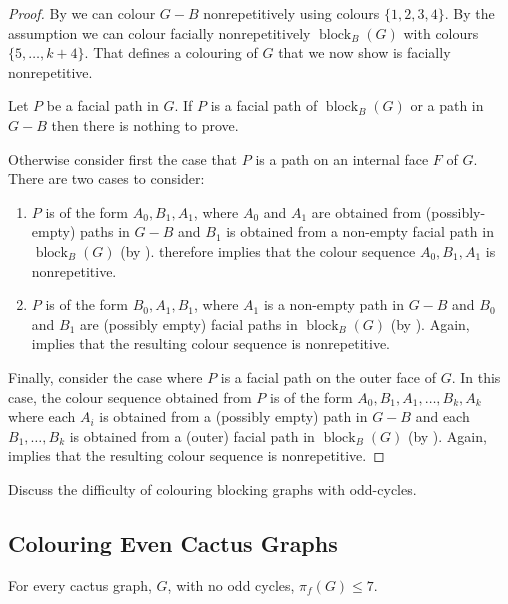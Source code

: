 \documentclass{patmorin}
\DeclareMathOperator{\block}{block}
\begin{document}
\begin{proof}
By  we can colour $G-B$ nonrepetitively using colours
$\{1,2,3,4\}$. By the assumption we can colour  facially
nonrepetitively $\block_{B}(G)$ with colours $\{5,\dots, k+4\}$. That
defines a colouring of $G$ that we now show is facially
nonrepetitive. 

Let $P$ be a facial path in $G$. If $P$ is a facial path of
$\block_{B}(G)$ or a path in $G-B$ then there is nothing to prove.

Otherwise consider first the case that $P$ is a path on an internal
face $F$ of $G$.   There are two cases to consider:
\begin{enumerate}
\item $P$ is of the form $A_0,B_1,A_1$, where $A_0$ and $A_1$ are obtained
from (possibly-empty) paths in $G-B$ and $B_1$ is obtained from a
non-empty facial path in $\block_B(G)$ (by ).   therefore
implies that the colour sequence $A_0,B_1,A_1$ is nonrepetitive.

\item $P$ is of the form $B_0,A_1,B_1$, where $A_1$ is a non-empty path
  in $G-B$ and $B_0$ and $B_1$ are (possibly empty) facial paths in
  $\block_B(G)$ (by ).
Again,  implies that the resulting colour sequence
is nonrepetitive.
\end{enumerate}

Finally, consider the case where $P$ is a facial path on the outer
face of $G$.  In this case, the colour sequence obtained from $P$ is
of the form $A_0,B_1,A_1,\ldots,B_k,A_k$ where each $A_i$ is obtained
from a (possibly empty) path in $G-B$ and each $B_1,\ldots,B_k$ is
obtained from a (outer) facial path in $\block_B(G)$ (by ). 
Again,  implies that the resulting colour sequence
is nonrepetitive.
\end{proof}

Discuss the difficulty of colouring blocking graphs with odd-cycles.

\subsection{Colouring Even Cactus Graphs}







\begin{lem}
   For every cactus graph, $G$, with no odd cycles, $\pi_f(G)\le 7$.
\end{lem}
\end{document}
